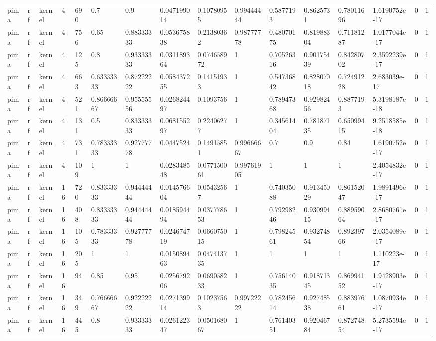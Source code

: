 \begin{tabular}{llllllllllllllll}
pima & rf & kernel & 4 & 690 & 0.7 & 0.9 & 0.047199014 & 0.10780955 & 0.99444444 & 0.5877193 & 0.8625731 & 0.78011696 & 1.6190752e-17 & 0 & 1 \\
pima & rf & kernel & 4 & 756 & 0.65 & 0.88333333 & 0.053675838 & 0.21380362 & 0.98777778 & 0.48070175 & 0.81988304 & 0.71181287 & 1.0177044e-17 & 0 & 1 \\
pima & rf & kernel & 4 & 125 & 0.8 & 0.93333333 & 0.031189364 & 0.074658972 & 1 & 0.70526316 & 0.90175439 & 0.84280702 & 2.3592239e-17 & 0 & 1 \\
pima & rf & kernel & 4 & 663 & 0.63333333 & 0.87222222 & 0.058437255 & 0.14151933 & 1 & 0.54736842 & 0.82807018 & 0.72491228 & 2.683039e-17 & 0 & 1 \\
pima & rf & kernel & 4 & 521 & 0.86666667 & 0.95555556 & 0.026824497 & 0.1093756 & 1 & 0.78947368 & 0.92982456 & 0.8877193 & 5.3198187e-18 & 0 & 1 \\
pima & rf & kernel & 4 & 131 & 0.5 & 0.83333333 & 0.068155297 & 0.22406277 & 1 & 0.34561404 & 0.78187135 & 0.65099415 & 9.2518585e-18 & 0 & 1 \\
pima & rf & kernel & 4 & 731 & 0.78333333 & 0.92777778 & 0.0447524 & 0.14915851 & 0.99666667 & 0.7 & 0.9 & 0.84 & 1.6190752e-17 & 0 & 1 \\
pima & rf & kernel & 4 & 109 & 1 & 1 & 0.028348548 & 0.077150061 & 0.99761905 & 1 & 1 & 1 & 2.4054832e-17 & 0 & 1 \\
pima & rf & kernel & 16 & 720 & 0.83333333 & 0.94444444 & 0.014576604 & 0.05432567 & 1 & 0.74035088 & 0.91345029 & 0.86152047 & 1.9891496e-17 & 0 & 1 \\
pima & rf & kernel & 16 & 408 & 0.83333333 & 0.94444444 & 0.018594494 & 0.037778653 & 1 & 0.79298246 & 0.93099415 & 0.88959064 & 2.8680761e-17 & 0 & 1 \\
pima & rf & kernel & 16 & 105 & 0.78333333 & 0.92777778 & 0.024674719 & 0.066075015 & 1 & 0.79824561 & 0.93274854 & 0.89239766 & 2.0354089e-17 & 0 & 1 \\
pima & rf & kernel & 16 & 205 & 1 & 1 & 0.015089463 & 0.047413735 & 1 & 1 & 1 & 1 & 1.110223e-17 & 0 & 1 \\
pima & rf & kernel & 16 & 94 & 0.85 & 0.95 & 0.025679206 & 0.069058233 & 1 & 0.75614035 & 0.91871345 & 0.86994152 & 1.9428903e-17 & 0 & 1 \\
pima & rf & kernel & 16 & 349 & 0.76666667 & 0.92222222 & 0.027139914 & 0.10237563 & 0.99722222 & 0.78245614 & 0.92748538 & 0.88397661 & 1.0870934e-17 & 0 & 1 \\
pima & rf & kernel & 16 & 445 & 0.8 & 0.93333333 & 0.026122347 & 0.050168067 & 1 & 0.76140351 & 0.92046784 & 0.87274854 & 5.2735594e-17 & 0 & 1 \\

\end{tabular}

